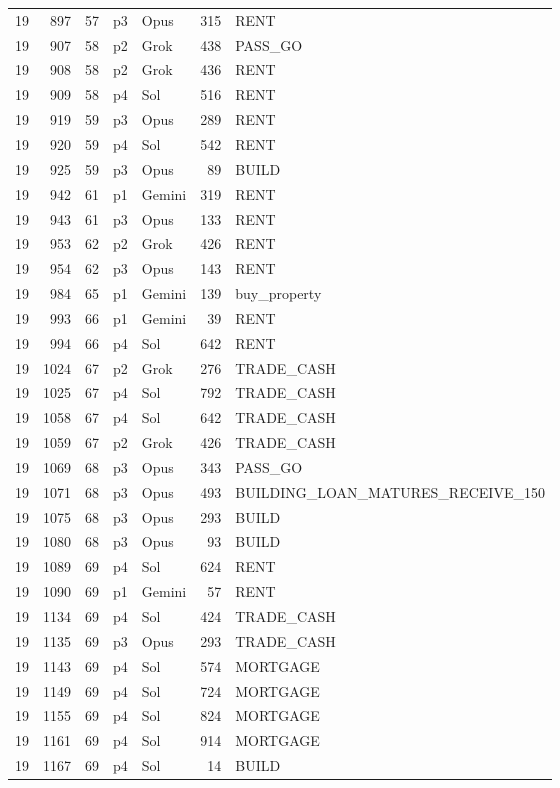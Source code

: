\begin{longtable}{r r r l l r L{2.2in}}
19 & 897 & 57 & p3 & Opus & 315 & RENT \\
19 & 907 & 58 & p2 & Grok & 438 & PASS\_GO \\
19 & 908 & 58 & p2 & Grok & 436 & RENT \\
19 & 909 & 58 & p4 & Sol & 516 & RENT \\
19 & 919 & 59 & p3 & Opus & 289 & RENT \\
19 & 920 & 59 & p4 & Sol & 542 & RENT \\
19 & 925 & 59 & p3 & Opus & 89 & BUILD \\
19 & 942 & 61 & p1 & Gemini & 319 & RENT \\
19 & 943 & 61 & p3 & Opus & 133 & RENT \\
19 & 953 & 62 & p2 & Grok & 426 & RENT \\
19 & 954 & 62 & p3 & Opus & 143 & RENT \\
19 & 984 & 65 & p1 & Gemini & 139 & buy\_property \\
19 & 993 & 66 & p1 & Gemini & 39 & RENT \\
19 & 994 & 66 & p4 & Sol & 642 & RENT \\
19 & 1024 & 67 & p2 & Grok & 276 & TRADE\_CASH \\
19 & 1025 & 67 & p4 & Sol & 792 & TRADE\_CASH \\
19 & 1058 & 67 & p4 & Sol & 642 & TRADE\_CASH \\
19 & 1059 & 67 & p2 & Grok & 426 & TRADE\_CASH \\
19 & 1069 & 68 & p3 & Opus & 343 & PASS\_GO \\
19 & 1071 & 68 & p3 & Opus & 493 & BUILDING\_LOAN\_MATURES\_RECEIVE\_150 \\
19 & 1075 & 68 & p3 & Opus & 293 & BUILD \\
19 & 1080 & 68 & p3 & Opus & 93 & BUILD \\
19 & 1089 & 69 & p4 & Sol & 624 & RENT \\
19 & 1090 & 69 & p1 & Gemini & 57 & RENT \\
19 & 1134 & 69 & p4 & Sol & 424 & TRADE\_CASH \\
19 & 1135 & 69 & p3 & Opus & 293 & TRADE\_CASH \\
19 & 1143 & 69 & p4 & Sol & 574 & MORTGAGE \\
19 & 1149 & 69 & p4 & Sol & 724 & MORTGAGE \\
19 & 1155 & 69 & p4 & Sol & 824 & MORTGAGE \\
19 & 1161 & 69 & p4 & Sol & 914 & MORTGAGE \\
19 & 1167 & 69 & p4 & Sol & 14 & BUILD \\

\end{longtable}
